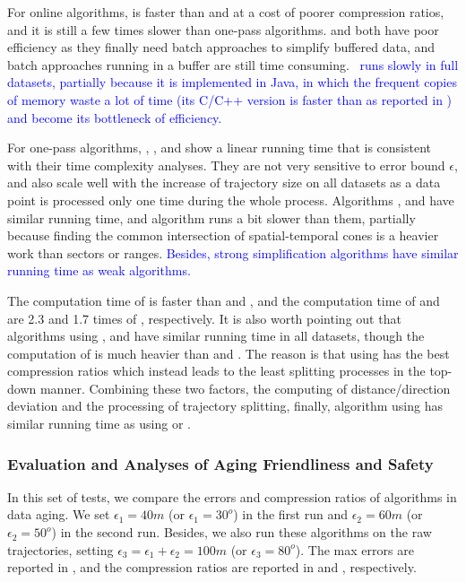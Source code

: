 {For online algorithms, \squishe is faster than \bqsa and \opwa at a cost of poorer compression ratios, and it is still a few times slower than one-pass algorithms. \bqsa and \opwa both have poor efficiency as they finally need batch approaches to simplify buffered data, and batch approaches running in a buffer are still time consuming. \textcolor{blue}{\dagots~runs slowly in full datasets, partially because it is implemented in Java, in which the frequent copies of memory waste a lot of time (its C/C++ version is faster than \squishe as reported in \cite{Zhang:Evaluation}) and become its bottleneck of efficiency.}

For one-pass algorithms, \operb, \siped, \cised and \interval show a linear running time that is consistent with their time complexity analyses. They are not very sensitive to error bound $\epsilon$, and also scale well with the increase of trajectory size on all datasets as a data point is processed only one time during the whole process.
Algorithms \siped, \operb and \interval have similar running time, and algorithm \cised runs a bit slower than them, partially because finding the common intersection of spatial-temporal cones is a heavier work than sectors or ranges. 
\textcolor{blue}{Besides, strong simplification algorithms have similar running time as weak algorithms.}



The computation time of \dad is faster than \ped and \sed, and the computation time of \ped and \sed are 2.3 and 1.7 times of \dad, respectively.
{It is also worth pointing out that algorithms \dpa using \ped, \sed and \dad have similar running time in all datasets, though the computation of \ped is much heavier than \sed and \dad. The reason is that \dpa using \ped has the best compression ratios which instead leads to the least splitting processes in the top-down manner. Combining these two factors, \ie the computing of distance/direction deviation and the processing of trajectory splitting, finally, algorithm \dpa using \ped has similar running time as \dpa using \dad or \sed.}

\subsubsection{{Evaluation and Analyses of Aging Friendliness and Safety}}
\label{sec:exp-data-aging}
In this set of tests, we compare the errors and compression ratios of algorithms in data aging. We set $\epsilon_1=40m$ (or $\epsilon_1=30^o$) in the first run and $\epsilon_2=60m$ (or $\epsilon_2=50^o$) in the second run. Besides, we also run these algorithms on the raw trajectories, setting $\epsilon_3=\epsilon_1 + \epsilon_2=100m$ (or $\epsilon_3=80^o$). The max errors are reported in , and the compression ratios are reported in  and , respectively.

}
